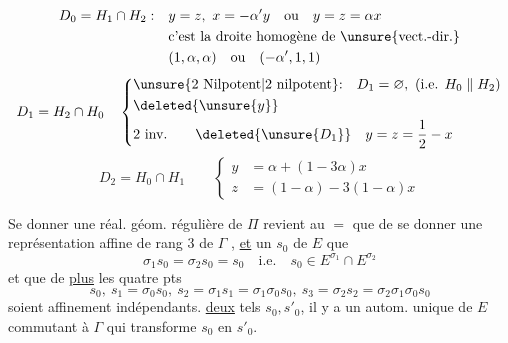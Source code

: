 \[
\begin{aligned}
 D_0=H_1\cap H_2:\quad &y=z,\ x=-\alpha'y\quad\text{ou}\quad y=z=\alpha x\\
 &\text{c'est la droite homogène de \unsure{vect.-dir.}}\\
 &(1,\alpha,\alpha)\quad\text{ou}\quad(-\alpha',1,1)
\end{aligned}
\]
\[
 D_1=H_2\cap H_0\quad
 \left\{\begin{aligned}
 &\text{\unsure{2 Nilpotent|2 nilpotent}:}\quad D_1=\varnothing,\ (\text{i.e. }H_0\parallel H_2)\\
 &\deleted{\unsure{y}}\\
 &\text{2 inv.}\qquad\deleted{\unsure{D_1}}\quad y=z=\frac12-x
 \end{aligned}\right.
\]
\[
 D_2=H_0\cap H_1\qquad
 \left\{\begin{aligned}
 y&=\alpha+(1-3\alpha)x\\
 z&=(1-\alpha)-3(1-\alpha)x
 \end{aligned}\right.
\]

Se donner une réal. géom. régulière de $\Pi$ revient au $=$ que de se donner une représentation affine de rang 3 de $\Gamma$ , \uline{et} un   $s_0$ de $E$  que
\[
 \sigma_1s_0=\sigma_2s_0=s_0\quad\text{i.e.}\quad s_0\in E^{\sigma_1}\cap E^{\sigma_2}
\]
et  que de \uline{plus} les quatre pts
\[
 s_0,\ s_1=\sigma_0s_0,\ s_2=\sigma_1s_1=\sigma_1\sigma_0s_0,\ s_3=\sigma_2s_2=\sigma_2\sigma_1\sigma_0s_0
\]
soient affinement indépendants.    \uline{deux} tels $s_0,s'_0$, il y a un autom. unique de $E$ commutant à $\Gamma$ qui transforme $s_0$ en $s'_0$.


